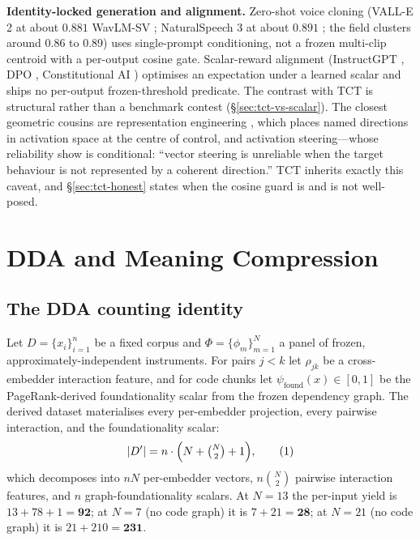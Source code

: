 \documentclass[10pt,twocolumn]{article}
\begin{document}
\textbf{Identity-locked generation and alignment.} Zero-shot voice cloning (VALL-E
2 at about $0.881$ WavLM-SV \citep{chen2024valle2}; NaturalSpeech 3 at about
$0.891$ \citep{ju2024naturalspeech3}; the field clusters around 0.86 to 0.89) uses
single-prompt conditioning, not a frozen multi-clip centroid with a per-output
cosine gate. Scalar-reward alignment (InstructGPT \citep{ouyang2022instructgpt},
DPO \citep{rafailov2023dpo}, Constitutional AI \citep{bai2022constitutional})
optimises an expectation under a learned scalar and ships no per-output
frozen-threshold predicate. The contrast with TCT is structural rather than a
benchmark contest (\S\ref{sec:tct-vs-scalar}). The closest geometric cousins are
representation engineering \citep{zou2023repe}, which places named directions in
activation space at the centre of control, and activation steering---whose
reliability \citet{braun2025steering} show is conditional: ``vector steering is
unreliable when the target behaviour is not represented by a coherent
direction.'' TCT inherits exactly this caveat, and \S\ref{sec:tct-honest} states
when the cosine guard is and is not well-posed.

\section{DDA and Meaning Compression}

\subsection{The DDA counting identity}
Let $D=\{x_i\}_{i=1}^n$ be a fixed corpus and $\Phi=\{\phi_m\}_{m=1}^N$ a panel of
frozen, approximately-independent instruments. For pairs $j<k$ let $\rho_{jk}$ be
a cross-embedder interaction feature, and for code chunks let
$\psi_{\mathrm{found}}(x)\in[0,1]$ be the PageRank-derived foundationality scalar
from the frozen dependency graph. The derived dataset materialises every
per-embedder projection, every pairwise interaction, and the foundationality
scalar:
\begin{equation}
|D'| = n\cdot\Bigl(N + \tbinom{N}{2} + 1\Bigr),\tag{1}
\end{equation}
which decomposes into $nN$ per-embedder vectors, $n\binom{N}{2}$ pairwise
interaction features, and $n$ graph-foundationality scalars. At $N=13$ the
per-input yield is $13+78+1 = \mathbf{92}$; at $N=7$ (no code graph) it is
$7+21 = \mathbf{28}$; at $N=21$ (no code graph) it is $21+210 = \mathbf{231}$.
\end{document}
